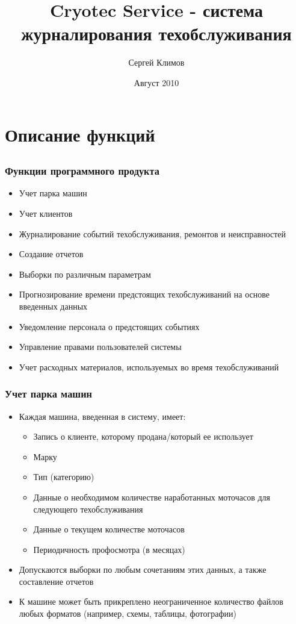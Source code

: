 \documentclass{beamer}
\title{Cryotec Service - система журналирования техобслуживания}
\author{Сергей Климов}
\date{Август 2010}
\begin{document}
\maketitle


\section{Описание функций}

\subsection{}
\begin{frame}
\frametitle{Функции программного продукта}
	\begin{itemize}
		\item Учет парка машин
		\item Учет клиентов
		\item Журналирование событий техобслуживания, ремонтов и неисправностей
		\item Создание отчетов
		\item Выборки по различным параметрам
		\item Прогнозирование времени предстоящих техобслуживаний на основе введенных
		данных
		\item Уведомление персонала о предстоящих событиях
		\item Управление правами пользователей системы
		\item Учет расходных материалов, используемых во время техобслуживаний
	\end{itemize}
\end{frame}


\begin{frame}
\frametitle{Учет парка машин}
	\begin{itemize}
		\item Каждая машина, введенная в систему, имеет:
		\begin{itemize}
			\item Запись о клиенте, которому продана/который ее использует
			\item Марку
			\item Тип (категорию)
			\item Данные о необходимом количестве наработанных моточасов для следующего
			техобслуживания
			\item Данные о текущем количестве моточасов
			\item Периодичность профосмотра (в месяцах)
		\end{itemize}
		\item Допускаются выборки по любым сочетаниям этих данных, а также составление
	отчетов
		\item К машине может быть прикреплено неограниченное количество файлов любых
		форматов (например, схемы, таблицы, фотографии)
	\end{itemize}
\end{frame}
\end{document}
